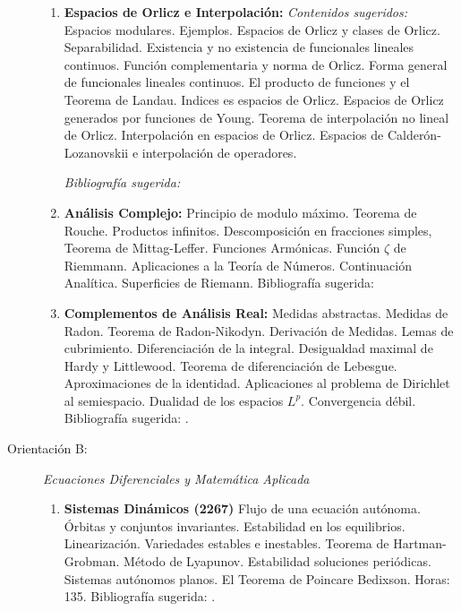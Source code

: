 \documentclass[a4paper, 12pt]{article}
\begin{document}
\begin{description}
\begin{enumerate}
\item\textbf{Espacios de Orlicz e Interpolación:} 
\emph{Contenidos sugeridos:} Espacios modulares. Ejemplos. Espacios de Orlicz y clases de Orlicz. Separabilidad. Existencia y no existencia de funcionales lineales continuos. Función complementaria y norma de Orlicz. Forma general de funcionales lineales continuos. El producto de funciones y el Teorema de Landau. Indices es espacios de Orlicz. Espacios de Orlicz generados por funciones de Young. Teorema de interpolación no lineal de Orlicz. Interpolación en espacios de Orlicz. Espacios de Calderón-Lozanovskii e interpolación de operadores.

\noindent \textit{Bibliografía sugerida: } \cite{ Harjulehto,Krbec,KR,J. Lang,M.M. Rao}





\item \textbf{Análisis Complejo:} Principio de modulo máximo. Teorema de
Rouche. Productos infinitos. Descomposición en fracciones simples,
Teorema de Mittag-Leffer. Funciones Armónicas. Función $\zeta$ de
Riemmann. Aplicaciones a la Teoría de Números. Continuación
Analítica. Superficies de Riemann. Bibliografía sugerida:
\cite{ahlfors,conway}

\item\textbf{Complementos de Análisis Real:} Medidas abstractas. Medidas de
Radon. Teorema de Radon-Nikodyn. Derivación de Medidas. Lemas de
cubrimiento. Diferenciación de la integral. Desigualdad maximal de
Hardy y Littlewood. Teorema de diferenciación de Lebesgue.
Aproximaciones de la identidad. Aplicaciones al problema de
Dirichlet al semiespacio. Dualidad de los espacios $L^p$.
Convergencia débil. Biblio\-grafía sugerida:
\cite{evansgariepy,favazo,rudin}.


\end{enumerate}

\item[Orientación B:] \emph{Ecuaciones Diferenciales y Matemática Aplicada}
\begin{enumerate}



\item \textbf{Sistemas Dinámicos (2267)}  Flujo de una ecuación autónoma. Órbitas y conjuntos invariantes. Estabilidad en los equilibrios.   Linearización. Variedades estables e inestables. Teorema de Hartman-Grobman. Método de
Lyapunov. Estabilidad soluciones periódicas. Sistemas autónomos planos. El Teorema de Poincare Bedixson. Horas: 135. Bibliografía  sugerida: \cite{betounes2009differential,teschl2012ordinary}.


\end{enumerate}
\end{description}
\end{document}
